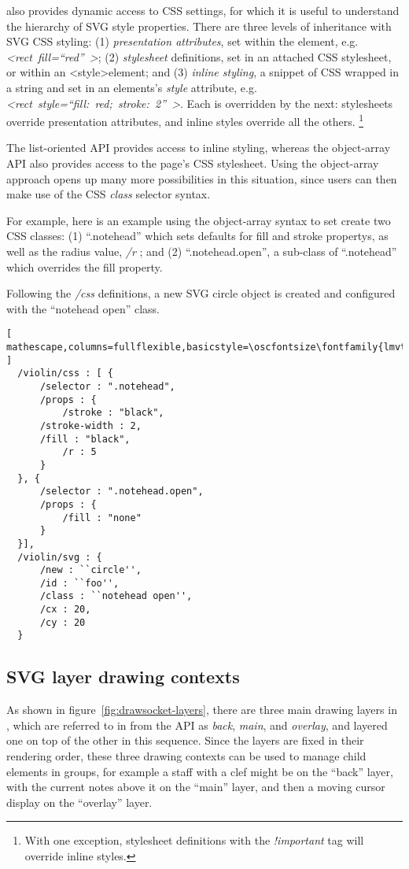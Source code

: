 \drawsocket also provides dynamic access to CSS settings, for which it is useful to understand the hierarchy of SVG style properties. There are three levels of inheritance with SVG CSS styling: (1) \textit{presentation attributes}, set within the element, e.g. \textit{\textless rect~fill=``red''~\textgreater}; 
(2) \textit{stylesheet} definitions, set in an attached CSS stylesheet, or within an \textless style\textgreater element;
and
(3) \textit{inline styling}, a snippet of CSS wrapped in a string and set in an elements's \textit{style} attribute, e.g. \textit{\textless rect~style=``fill:~red;~stroke:~2''~\textgreater}.
Each is overridden by the next: stylesheets override presentation attributes, and inline styles override all the others. \footnote{With one exception, stylesheet definitions with the \textit{!important} tag will override inline styles.} 

The list-oriented API provides access to inline styling, whereas the object-array API also provides access to the page's CSS stylesheet.
Using the object-array approach opens up many more possibilities in this situation, since users can then make use of the CSS \textit{class} selector syntax.

For example, here is an example using the object-array syntax to set create two CSS classes: (1) ``.notehead'' which sets defaults for fill and stroke propertys, as well as the radius value, \textit{/r} ; and (2) ``.notehead.open'', a sub-class of ``.notehead'' which overrides the fill property. 

Following the \textit{/css} definitions, a new SVG circle object is created and configured with the ``notehead open'' class.

\begin{lstlisting}[ mathescape,columns=fullflexible,basicstyle=\oscfontsize\fontfamily{lmvtt}\selectfont ]
  /violin/css : [ {
      /selector : ".notehead",
      /props : {
          /stroke : "black",
	  /stroke-width : 2,
	  /fill : "black",
          /r : 5
      }
  }, {
      /selector : ".notehead.open",
      /props : {
          /fill : "none"
      }
  }],
  /violin/svg : {
      /new : ``circle'',
      /id : ``foo'',
      /class : ``notehead open'',
      /cx : 20,
      /cy : 20
  }
 \end{lstlisting}


\subsection{SVG layer drawing contexts}\label{sec:contexts}
As shown in figure~\ref{fig:drawsocket-layers}, there are three main drawing layers in \drawsocket, which are referred to in from the API as \textit{back}, \textit{main}, and \textit{overlay}, and layered one on top of the other in this sequence.
Since the layers are fixed in their rendering order, these three drawing contexts can be used to manage child elements in groups, for example a staff with a clef might be on the ``back'' layer, with the current notes above it on the ``main'' layer, and then a moving cursor display on the ``overlay'' layer.

